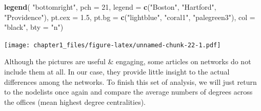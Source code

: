 \documentclass[
]{book}
\newenvironment{Shaded}{\begin{snugshade}}{\end{snugshade}}
\newcommand{\AttributeTok}[1]{\textcolor[rgb]{0.13,0.29,0.53}{#1}}
\newcommand{\DecValTok}[1]{\textcolor[rgb]{0.00,0.00,0.81}{#1}}
\newcommand{\FloatTok}[1]{\textcolor[rgb]{0.00,0.00,0.81}{#1}}
\newcommand{\FunctionTok}[1]{\textcolor[rgb]{0.13,0.29,0.53}{\textbf{#1}}}
\newcommand{\NormalTok}[1]{#1}
\newcommand{\StringTok}[1]{\textcolor[rgb]{0.31,0.60,0.02}{#1}}
\begin{document}
\begin{Shaded}
\begin{Highlighting}[]
\FunctionTok{legend}\NormalTok{(}
  \StringTok{"bottomright"}\NormalTok{,}
  \AttributeTok{pch =} \DecValTok{21}\NormalTok{,}
  \AttributeTok{legend =} \FunctionTok{c}\NormalTok{(}\StringTok{"Boston"}\NormalTok{, }\StringTok{"Hartford"}\NormalTok{, }\StringTok{"Providence"}\NormalTok{),}
  \AttributeTok{pt.cex =} \FloatTok{1.5}\NormalTok{,}
  \AttributeTok{pt.bg =} \FunctionTok{c}\NormalTok{(}\StringTok{"lightblue"}\NormalTok{, }\StringTok{"coral1"}\NormalTok{, }\StringTok{"palegreen3"}\NormalTok{),}
  \AttributeTok{col =} \StringTok{"black"}\NormalTok{,}
  \AttributeTok{bty =} \StringTok{"n"}\NormalTok{)}
\end{Highlighting}
\end{Shaded}

\texttt{[image: chapter1\_files/figure-latex/unnamed-chunk-22-1.pdf]}

Although the pictures are useful \& engaging, some articles on networks do not include them at all. In our case, they provide little insight to the actual differences among the networks. To finish this set of analysis, we will just return to the nodelists once again and compare the average numbers of degrees across the offices (mean highest degree centralities).
\end{document}
